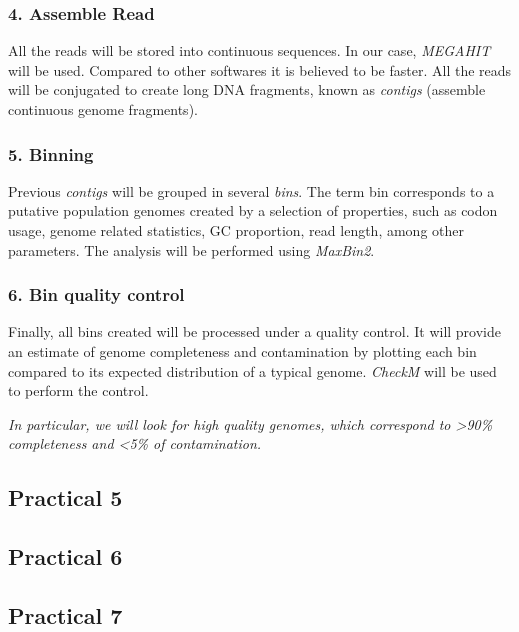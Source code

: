 \documentclass[
]{article}
\begin{document}
\hypertarget{assemble-read}{%
\subsubsection{4. Assemble Read}\label{assemble-read}}

All the reads will be stored into continuous sequences. In our case,
\emph{MEGAHIT} will be used. Compared to other softwares it is believed
to be faster. All the reads will be conjugated to create long DNA
fragments, known as \emph{contigs} (assemble continuous genome
fragments).

\hypertarget{binning}{%
\subsubsection{5. Binning}\label{binning}}

Previous \emph{contigs} will be grouped in several \emph{bins}. The term
bin corresponds to a putative population genomes created by a selection
of properties, such as codon usage, genome related statistics, GC
proportion, read length, among other parameters. The analysis will be
performed using \emph{MaxBin2}.

\hypertarget{bin-quality-control}{%
\subsubsection{6. Bin quality control}\label{bin-quality-control}}

Finally, all bins created will be processed under a quality control. It
will provide an estimate of genome completeness and contamination by
plotting each bin compared to its expected distribution of a typical
genome. \emph{CheckM} will be used to perform the control.

\emph{In particular, we will look for high quality genomes, which
correspond to \textgreater90\% completeness and \textless5\% of
contamination.}

\hypertarget{practical-5}{%
\subsection{Practical 5}\label{practical-5}}

\hypertarget{practical-6}{%
\subsection{Practical 6}\label{practical-6}}

\hypertarget{practical-7}{%
\subsection{Practical 7}\label{practical-7}}
\end{document}
